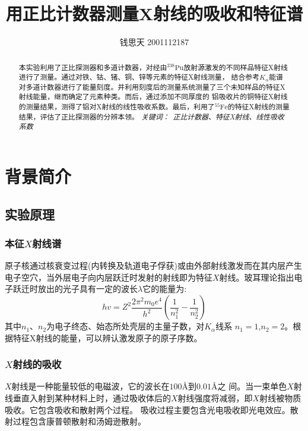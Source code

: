 \documentclass{article}
\title{用正比计数器测量X射线的吸收和特征谱}
\author{钱思天 2001112187}
\begin{document}
    \maketitle
    \begin{abstract}
        本实验利用了正比探测器和多道计数器，对经由$^{238}\text{Pu}$放射源激发的不同样品特征X射线进行了测量。通过对铁、钴、锗、铜、锌等元素的特征X射线测量，
        结合参考$K_\alpha$能谱对多道计数器进行了能量刻度。并利用刻度后的测量系统测量了三个未知样品的特征X射线能量，继而确定了元素种类。而后，通过添加不同厚度的
        铝吸收片的铜特征X射线的测量结果，测得了铝对X射线的线性吸收系数。最后，利用了$^{55}\text{Fe}$的特征X射线的测量结果，评估了正比探测器的分辨本领。
        \newline
        \newline
        {\emph{ 关键词：\ 正比计数器、特征X射线、线性吸收系数 }\rm}

    \end{abstract}

    \section{背景简介}
    \subsection{实验原理}
    \subsubsection{本征$X$射线谱}
    原子核通过核衰变过程(内转换及轨道电子俘获)或由外部射线激发而在其内层产生电子空穴，当外层电子向内层跃迁时发射的射线即为特征$X$射线。玻耳理论指出电子跃迁时放出的光子具有一定的波长$\lambda$它的能量为:
    \begin{equation}
        h v=Z^{2} \frac{2 \pi^{2} m_{0} e^{4}}{h^{2}}\left(\frac{1}{n_{1}^{2}}-\frac{1}{n_{2}^{2}}\right)
    \end{equation}
其中$n_1$、$n_2$为电子终态、始态所处壳层的主量子数，对$K_\alpha$线系
$n_1=1$,$n_2=2$。根据特征X射线的能量，可以辨认激发原子的原子序数。
    \subsubsection{$X$射线的吸收}
    $X$射线是一种能量较低的电磁波，它的波长在$100\text{\AA}$到$0.01\text{\AA}$之
间。当一束单色$X$射线垂直入射到某种材料上时，通过吸收体后的$X$射线强度将减弱，即$X$射线被物质吸收。它包含吸收和散射两个过程。
吸收过程主要包含光电吸收即光电效应。散射过程包含康普顿散射和汤姆逊散射。
\end{document}
